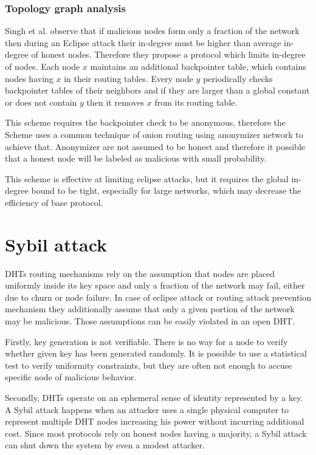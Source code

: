   \subsubsection{Topology graph analysis}
  Singh et al. \cite[p. 23]{urd11} observe that if malicious nodes form only a
  fraction of the network then during an Eclipse attack their in-degree must be
  higher than average in-degree of honest nodes. Therefore they propose a
  protocol which limits in-degree of nodes. Each node $x$ maintains an
  additional backpointer table, which contains nodes having $x$ in their routing
  tables. Every node $y$ periodically checks backpointer tables of their
  neighbors and if they are larger than a global constant or does not contain
  $y$ then it removes $x$ from its routing table.

  This scheme requires the backpointer check to be anonymous, therefore the
  Scheme uses a common technique of onion routing using anonymizer network to
  achieve that. Anonymizer are not assumed to be honest and therefore it
  possible that a honest node will be labeled as malicious with small
  probability.

  This scheme is effective at limiting eclipse attacks, but it requires the
  global in-degree bound to be tight, especially for large networks, which may
  decrease the efficiency of base protocol.

\section{Sybil attack}
  DHTs routing mechanisms rely on the assumption that nodes are placed uniformly
  inside its key space and only a fraction of the network may fail, either due
  to churn or node failure. In case of eclipse attack or routing attack
  prevention mechanism they additionally assume that only a given portion of the
  network may be malicious. Those assumptions can be easily violated in an open
  DHT.

  Firstly, key generation is not verifiable. There is no way for a node to
  verify whether given key has been generated randomly. It is possible to use a
  statistical test to verify uniformity constraints, but they are often not
  enough to accuse specific node of malicious behavior.

  Secondly, DHTs operate on an ephemeral sense of identity represented by a key.
  A Sybil attack happens when an attacker uses a single physical computer to
  represent multiple DHT nodes increasing his power without incurring additional
  cost. Since most protocols rely on honest nodes having a majority, a Sybil
  attack can shut down the system by even a modest attacker.

